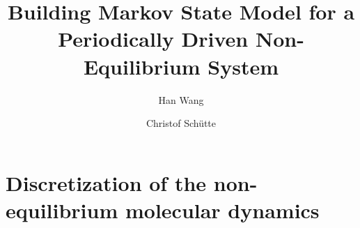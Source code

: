 \documentclass[preprint,unsortedaddress,a4paper,onecolumn]{revtex4-1}
\begin{document}
\title{Building Markov State Model for a Periodically Driven Non-Equilibrium System}
\author{Han Wang}
\author{Christof Sch\"utte}
   
\begin{abstract}
\end{abstract}

\maketitle

\section{Discretization of the non-equilibrium molecular dynamics}
\end{document}
